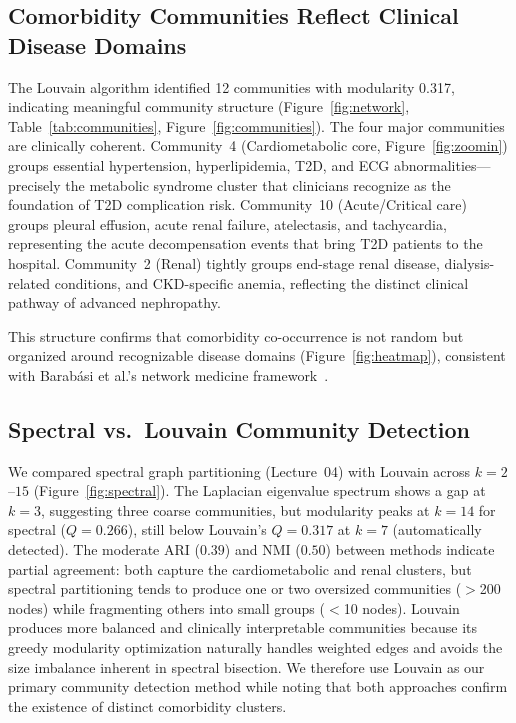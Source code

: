 \documentclass[10pt,twocolumn]{article}
\begin{document}
\subsection{Comorbidity Communities Reflect Clinical Disease Domains}

The Louvain algorithm identified 12 communities with modularity 0.317, indicating meaningful community structure (Figure~\ref{fig:network}, Table~\ref{tab:communities}, Figure~\ref{fig:communities}).
The four major communities are clinically coherent.
Community~4 (Cardiometabolic core, Figure~\ref{fig:zoomin}) groups essential hypertension, hyperlipidemia, T2D, and ECG abnormalities---precisely the metabolic syndrome cluster that clinicians recognize as the foundation of T2D complication risk.
Community~10 (Acute/Critical care) groups pleural effusion, acute renal failure, atelectasis, and tachycardia, representing the acute decompensation events that bring T2D patients to the hospital.
Community~2 (Renal) tightly groups end-stage renal disease, dialysis-related conditions, and CKD-specific anemia, reflecting the distinct clinical pathway of advanced nephropathy.

This structure confirms that comorbidity co-occurrence is not random but organized around recognizable disease domains (Figure~\ref{fig:heatmap}), consistent with Barab\'asi et al.'s network medicine framework~\cite{barabasi2011}.

\subsection{Spectral vs.\ Louvain Community Detection}

We compared spectral graph partitioning (Lecture~04) with Louvain across $k = 2$--$15$ (Figure~\ref{fig:spectral}).
The Laplacian eigenvalue spectrum shows a gap at $k = 3$, suggesting three coarse communities, but modularity peaks at $k = 14$ for spectral ($Q = 0.266$), still below Louvain's $Q = 0.317$ at $k = 7$ (automatically detected).
The moderate ARI ($0.39$) and NMI ($0.50$) between methods indicate partial agreement: both capture the cardiometabolic and renal clusters, but spectral partitioning tends to produce one or two oversized communities ($>$200 nodes) while fragmenting others into small groups ($<$10 nodes).
Louvain produces more balanced and clinically interpretable communities because its greedy modularity optimization naturally handles weighted edges and avoids the size imbalance inherent in spectral bisection.
We therefore use Louvain as our primary community detection method while noting that both approaches confirm the existence of distinct comorbidity clusters.
\end{document}
